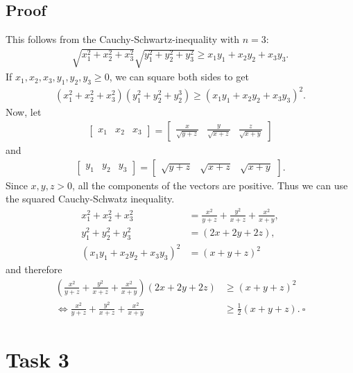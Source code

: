 \documentclass{article}
\begin{document}
\subsection*{Proof}
This follows from the Cauchy-Schwartz-inequality with $n=3$:
\begin{align*}
	\sqrt{x^2_1+x^2_2+x^2_3}\sqrt{y^2_1+y^2_2+ y^2_3}\geq x_1y_1+x_2y_2+ x_3y_3.
\end{align*}
If $x_1,x_2,x_3,y_1,y_2,y_3\geq 0$, we can square both sides to get
\begin{align*}
	(x^2_1+x^2_2+x^2_3)(y^2_1+y^2_2+y^3_2) \geq (x_1y_1+x_2y_2+x_3y_3)^2.
\end{align*}
Now, let
\begin{align*}
	\begin{bmatrix}
		x_1 & x_2 & x_3
	\end{bmatrix}
	=
	\begin{bmatrix}
		\frac{x}{\sqrt{y+z}}
		 & \frac{y}{\sqrt{x+z}}
		 & \frac{z}{\sqrt{x+y}}
	\end{bmatrix}
\end{align*}
and
\begin{align*}
	\begin{bmatrix}
		y_1 & y_2 & y_3
	\end{bmatrix}
	=
	\begin{bmatrix}
		\sqrt{y+z}
		 & \sqrt{x+z}
		 & \sqrt{x+y}
	\end{bmatrix}.
\end{align*}
Since $x,y,z>0$, all the components of the vectors are positive. Thus we can use the squared Cauchy-Schwatz inequality.
\begin{align*}
	x^2_1+x^2_2+x^2_3        & =\frac{x^2}{y+z}+\frac{y^2}{x+z}+\frac{x^2}{x+y}, \\
	y^2_1+y^2_2+y^2_3        & =(2x+2y+2z),                                      \\
	(x_1y_1+x_2y_2+x_3y_3)^2 & = (x+y+z)^2
\end{align*}
and therefore
\begin{align*}
	\left(\frac{x^2}{y+z}+\frac{y^2}{x+z}+\frac{x^2}{x+y}\right)\left(2x+2y+2z\right) & \geq (x+y+z)^2                    \\
	\Leftrightarrow \frac{x^2}{y+z}+\frac{y^2}{x+z}+\frac{x^2}{x+y}                   & \geq \frac{1}{2}(x+y+z).\:\square
\end{align*}
\section*{Task 3}
\end{document}
